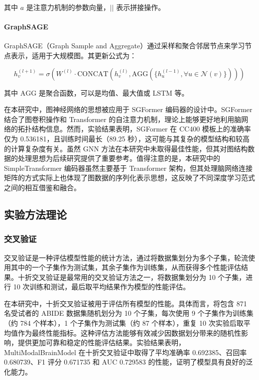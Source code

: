 \documentclass[12pt,a4paper]{article}
\begin{document}
其中 $a$ 是注意力机制的参数向量，$||$ 表示拼接操作。

\paragraph{GraphSAGE}
GraphSAGE（Graph Sample and Aggregate）通过采样和聚合邻居节点来学习节点表示，适用于大规模图。其更新公式为：

\begin{equation}
h_v^{(l+1)} = \sigma\left(W^{(l)} \cdot \text{CONCAT}(h_v^{(l)}, \text{AGG}(\{h_u^{(l-1)}, \forall u \in \mathcal{N}(v)\}))\right)
\end{equation}

其中 $\text{AGG}$ 是聚合函数，可以是均值、最大值或 LSTM 等。

在本研究中，图神经网络的思想被应用于 SGFormer 编码器的设计中。SGFormer 结合了图卷积操作和 Transformer 的自注意力机制，理论上能够更好地利用脑网络的拓扑结构信息。然而，实验结果表明，SGFormer 在 CC400 模板上的准确率仅为 0.536181，且训练时间最长（89.25 秒），这可能与其复杂的模型结构和较高的计算复杂度有关。虽然 GNN 方法在本研究中未取得最佳性能，但其对图结构数据的处理思想为后续研究提供了重要参考。值得注意的是，本研究中的 SimpleTransformer 编码器虽然主要基于 Transformer 架构，但其处理脑网络连接矩阵的方式实际上也体现了图数据的序列化表示思想，这反映了不同深度学习范式之间的相互借鉴和融合。

\subsection{实验方法理论}

\subsubsection{交叉验证}

交叉验证是一种评估模型性能的统计方法\cite{kohavi1995study}，通过将数据集划分为多个子集，轮流使用其中的一个子集作为测试集，其余子集作为训练集，从而获得多个性能评估结果。十折交叉验证是最常用的交叉验证方法之一，将数据集划分为 10 个子集，进行 10 次训练和测试，最后取平均结果作为模型的性能评估。

在本研究中，十折交叉验证被用于评估所有模型的性能。具体而言，将包含 871 名受试者的 ABIDE 数据集随机划分为 10 个子集，每次使用 9 个子集作为训练集（约 784 个样本），1 个子集作为测试集（约 87 个样本），重复 10 次实验后取平均值作为最终性能指标。这种评估方法能够有效减少因数据划分带来的随机性影响，提供更加可靠和稳定的性能评估结果。实验结果表明，MultiModalBrainModel 在十折交叉验证中取得了平均准确率 0.692385、召回率 0.680739、F1 评分 0.671735 和 AUC 0.729583 的性能，证明了模型具有良好的泛化能力。
\end{document}
